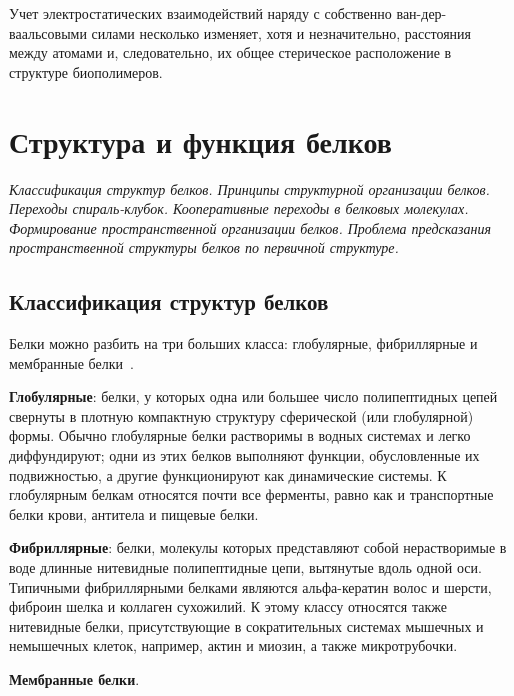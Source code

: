 \documentclass[12pt,a4paper,oneside]{book}
\begin{document}
Учет электростатических взаимодействий наряду с собственно ван-дер-ваальсовыми силами несколько изменяет, хотя и незначительно, расстояния между атомами и, следовательно, их общее стерическое расположение в структуре биополимеров.


\newpage
\section{Структура и функция белков}
{\it Классификация структур белков. Принципы структурной организации белков. Переходы спираль-клубок. Кооперативные переходы в белковых молекулах. Формирование пространственной организации белков. Проблема предсказания пространственной структуры белков по первичной структуре.}

\subsection{Классификация структур белков}

Белки можно разбить на три больших класса: глобулярные, фибриллярные и мембранные белки~\cite{Finkelshtejn2012}.

\textbf{Глобулярные}: белки, у которых одна или большее число полипептидных цепей свернуты в плотную компактную структуру сферической (или глобулярной) формы. Обычно глобулярные белки растворимы в водных системах и легко диффундируют; одни из этих белков выполняют функции, обусловленные их подвижностью, а другие функционируют как динамические системы. К глобулярным белкам относятся почти все ферменты, равно как и транспортные белки крови, антитела и пищевые белки.

\textbf{Фибриллярные}: белки, молекулы которых представляют собой нерастворимые в воде длинные нитевидные полипептидные цепи, вытянутые вдоль одной оси. Типичными фибриллярными белками являются альфа-кератин волос и шерсти, фиброин шелка и коллаген сухожилий. К этому классу относятся также нитевидные белки, присутствующие в сократительных системах мышечных и немышечных клеток, например, актин и миозин, а также микротрубочки.

\textbf{Мембранные белки}.
\end{document}
